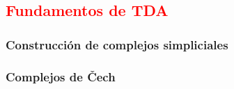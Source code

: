 \documentclass[a4paper,11pt]{article}
\newcommand{\red}[1]{\textcolor{red}{#1}}
\begin{document}
\pagebreak
\subsection{\red{Fundamentos de TDA}}






\subsubsection{Construcción de complejos simpliciales}




\subsubsection*{Complejos de Čech}
\end{document}
